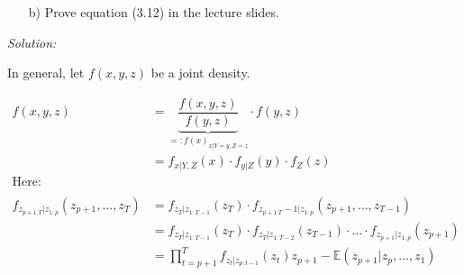 \documentclass[12pt,a4paper]{article}
\begin{document}
\begin{itemize}
    \item[b)] Prove equation (3.12) in the lecture slides.
\end{itemize}

\emph{Solution:}

In general, let \(f(x,y,z)\) be a joint density.

\begin{align*}
  f(x,y,z) & = \underbrace{\dfrac{f(x,y,z)}{f(y,z)}}_{=: f(x)_{x|Y = y, Z = z}} \cdot f(y,z)\\
  & = f_{x| Y,Z} (x) \cdot f_{y|Z} (y) \cdot f_{Z} (z)
\\
\text{Here:} \\
\\
 f_{z_{p+1_:T}| z_{1:p}}(z_{p+1}, \ldots , z_{T}) & = f_{z_{T}| z_{1:T-1}} (z_{T}) \cdot f_{z_{p+1_:T}-1| z_{1:p}}(z_{p+1}, \ldots , z_{T-1}) \\
 & = f_{z_{T}| z_{1:T-1}} (z_{T})  \cdot f_{z_{T}| z_{1:T-2}} (z_{T-1}) \cdot \ldots \cdot f_{z_{p+1} | z_{1:p}} (z_{p+1}) \\
 & = \prod_{t = p +1 }^{T} f_{z_t | z_{p:t-1}} (z_t) z_{p+1} - \mathbb{E} \left( z_{p+1}| z_{p}, \ldots , z_{1} \right)
\end{align*}
\end{document}
